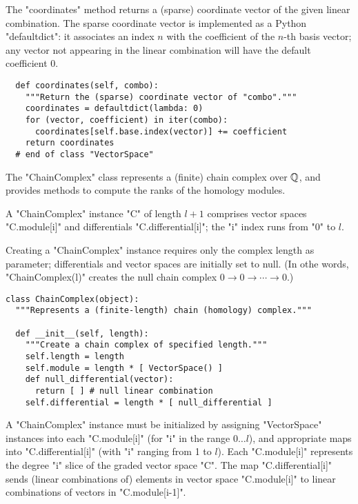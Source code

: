 The "coordinates" method returns a (sparse) coordinate vector of the
given linear combination.  The sparse coordinate vector is implemented
as a Python "defaultdict":  it associates an index $n$ with the
coefficient of the $n$-th basis vector; any vector not appearing in
the linear combination will have the default coefficient $0$.
\begin{lstlisting}
  def coordinates(self, combo):
    """Return the (sparse) coordinate vector of "combo"."""
    coordinates = defaultdict(lambda: 0) 
    for (vector, coefficient) in iter(combo):
      coordinates[self.base.index(vector)] += coefficient
    return coordinates
  # end of class "VectorSpace"

\end{lstlisting}

The "ChainComplex" class represents a (finite) chain complex over
$\mathbb{Q}$, and provides methods to compute the ranks of the homology
modules.

A "ChainComplex" instance "C" of length $l+1$ comprises vector spaces
"C.module[i]" and differentials "C.differential[i]"; the "i" index
runs from "0" to $l$.  

Creating a "ChainComplex" instance requires only the complex length as
parameter; differentials and vector spaces are initially set to null.
(In othe words, "ChainComplex(l)" creates the null chain complex $0
\to 0 \to \cdots \to 0$.)
\begin{lstlisting}
class ChainComplex(object):
  """Represents a (finite-length) chain (homology) complex."""

  def __init__(self, length):
    """Create a chain complex of specified length."""
    self.length = length
    self.module = length * [ VectorSpace() ]
    def null_differential(vector):
      return [ ] # null linear combination
    self.differential = length * [ null_differential ]

\end{lstlisting}
A "ChainComplex" instance must be initialized by assigning
"VectorSpace" instances into each "C.module[i]" (for "i" in the range
$0 \ldots l$), and appropriate maps into "C.differential[i]" (with "i"
ranging from 1 to $l$).  Each "C.module[i]" represents the degree "i"
slice of the graded vector space "C".  The map "C.differential[i]"
sends (linear combinations of) elements in vector space "C.module[i]"
to linear combinations of vectors in "C.module[i-1]".

